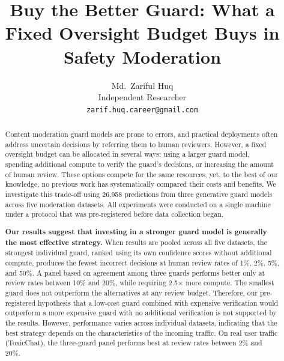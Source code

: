 \documentclass[11pt]{article}
\title{Buy the Better Guard: What a Fixed Oversight Budget Buys in Safety Moderation}
\author{Md.\ Zariful Huq\\
Independent Researcher\\
\texttt{zarif.huq.career@gmail.com}}
\date{}
\begin{document}
\maketitle

\begin{abstract}
Content moderation guard models are prone to errors, and practical deployments often address uncertain decisions by referring them to human reviewers. However, a fixed oversight budget can be allocated in several ways: using a larger guard model, spending additional compute to verify the guard's decisions, or increasing the amount of human review. These options compete for the same resources, yet, to the best of our knowledge, no previous work has systematically compared their costs and benefits. We investigate this trade-off using 26,958 predictions from three generative guard models across five moderation datasets. All experiments were conducted on a single machine under a protocol that was pre-registered before data collection began.

\textbf{Our results suggest that investing in a stronger guard model is generally the most effective strategy.} When results are pooled across all five datasets, the strongest individual guard, ranked using its own confidence scores without additional compute, produces the fewest incorrect decisions at human review rates of 1\%, 2\%, 5\%, and 50\%. A panel based on agreement among three guards performs better only at review rates between 10\% and 20\%, while requiring 2.5$\times$ more compute. The smallest guard does not outperform the alternatives at any review budget. Therefore, our pre-registered hypothesis that a low-cost guard combined with expensive verification would outperform a more expensive guard with no additional verification is not supported by the results. However, performance varies across individual datasets, indicating that the best strategy depends on the characteristics of the incoming traffic. On real user traffic (ToxicChat), the three-guard panel performs best at review rates between 2\% and 20\%.


\end{abstract}
\end{document}
